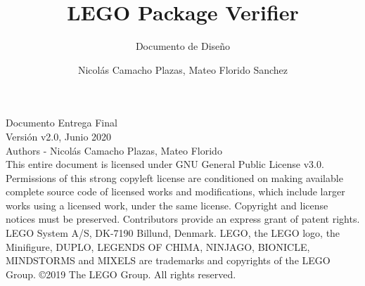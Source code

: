 \documentclass[letterpaper]{scrreprt}
\title{LEGO Package Verifier}
\subtitle{Documento de Diseño}
\author{Nicolás Camacho Plazas, Mateo Florido Sanchez}
\begin{document}
\restoregeometry %
\nopagecolor%

\maketitle
\noindent
Documento Entrega Final\\ 
Versión v2.0, Junio 2020\\
Authors - Nicolás Camacho Plazas, Mateo Florido\\
This entire document is licensed under GNU General Public License v3.0. Permissions of this strong copyleft license are conditioned on making available complete source code of licensed works and modifications, which include larger works using a licensed work, under the same license. Copyright and license notices must be preserved. Contributors provide an express grant of patent rights.\\
LEGO System A/S, DK-7190 Billund, Denmark. LEGO, the LEGO logo, the Minifigure, DUPLO, LEGENDS OF CHIMA, NINJAGO, BIONICLE, MINDSTORMS and MIXELS are trademarks and copyrights of the LEGO Group. ©2019 The LEGO Group. All rights reserved.

\newpage

\tableofcontents

\end{document}
